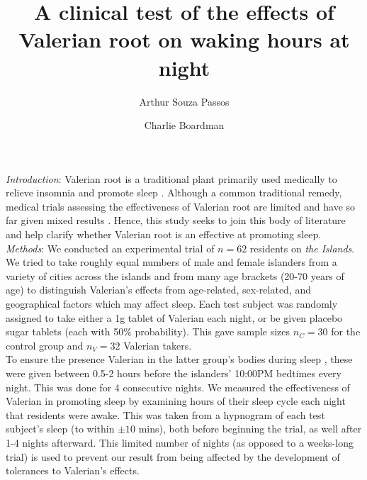 \documentclass[10pt,preprintnumbers,amsmath,amssymb,floatfix,twocolumn,prl]{revtex4-2}
\begin{document}
\title{A clinical test of the effects of Valerian root on waking hours at night}
\author{Arthur Souza Passos}
\author{Charlie Boardman}

\maketitle

\textit{Introduction}: Valerian root is a traditional plant primarily used medically to relieve insomnia and promote sleep \cite{ValerianSource1}. Although a common traditional remedy, medical trials assessing the effectiveness of Valerian root are limited and have so far given mixed results \cite{ValerianSource2}. Hence, this study seeks to join this body of literature and help clarify whether Valerian root is an effective at promoting sleep. \\

\textit{Methods}: 
We conducted an experimental trial of $n=62$ residents on \emph{the Islands}. We tried to take roughly equal numbers of male and female islanders from a variety of cities across the islands and from many age brackets (20-70 years of age) to distinguish Valerian's effects from age-related, sex-related, and geographical factors which may affect sleep. Each test subject was randomly assigned to take either a 1g tablet of Valerian each night, or be given placebo sugar tablets (each with 50\% probability). This gave sample sizes $n_C = 30$ for the control group and $n_V = 32$ Valerian takers. \\

To ensure the presence Valerian in the latter group's bodies during sleep \cite{ValerianSource1}, these were given between 0.5-2 hours before the islanders' 10:00PM bedtimes every night. This was done for 4 consecutive nights. We measured the effectiveness of Valerian in promoting sleep by examining hours of their sleep cycle each night that residents were awake. This was taken from a hypnogram of each test subject’s sleep (to within $\pm10$ mins), both before beginning the trial, as well after 1-4 nights afterward. This limited number of nights (as opposed to a weeks-long trial) is used to prevent our result from being affected by the development of tolerances to Valerian's effects. \\
\end{document}
